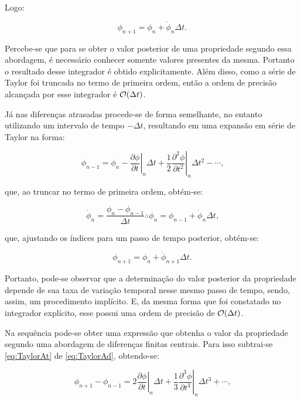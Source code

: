 \documentclass[_ArquivoPrincipal.tex]{subfiles}
\begin{document}
\noindent Logo:

\begin{equation}
    \phi_{n+1}=\phi_n+\dot{\phi}_n\Delta t\text{.}
\end{equation}

Percebe-se que para se obter o valor posterior de uma propriedade segundo essa abordagem, é necessário conhecer somente valores presentes da mesma. Portanto o resultado desse integrador é obtido explicitamente. Além disso, como a série de Taylor foi truncada no termo de primeira ordem, então a ordem de precisão alcançada por esse integrador é $\mathcal{O}(\Delta t)$.

Já nas diferenças atrasadas procede-se de forma semelhante, no entanto utilizando um intervalo de tempo $-\Delta t$, resultando em uma expansão em série de Taylor na forma:

\begin{equation}
    \phi_{n-1}=\phi_n-\left.\frac{\partial\phi}{\partial t}\right|_n\Delta t+\frac{1}{2}\left.\frac{\partial^2\phi}{\partial t^2}\right|_n\Delta t^2-\cdots\text{,}\label{eq:TaylorAt}
\end{equation}

\noindent que, ao truncar no termo de primeira ordem, obtém-se:

\begin{equation}
    \dot{\phi}_n=\frac{\phi_n-\phi_{n-1}}{\Delta t}\therefore
    \phi_n=\phi_{n-1}+\dot{\phi}_n\Delta t\text{,}
\end{equation}

\noindent que, ajustando os índices para um passo de tempo posterior, obtém-se:

\begin{equation}
    \phi_{n+1}=\phi_n+\dot{\phi}_{n+1}\Delta t\text{.}
\end{equation}

Portanto, pode-se observar que a determinação do valor posterior da propriedade depende de sua taxa de variação temporal nesse mesmo passo de tempo, sendo, assim, um procedimento implícito. E, da mesma forma que foi constatado no integrador explícito, esse possui uma ordem de precisão de $\mathcal{O}(\Delta t)$.

Na sequência pode-se obter uma expressão que obtenha o valor da propriedade segundo uma abordagem de diferenças finitas centrais. Para isso subtrai-se \ref{eq:TaylorAt} de \ref{eq:TaylorAd}, obtendo-se:

\begin{equation}
    \phi_{n+1}-\phi_{n-1}=2\left.\frac{\partial\phi}{\partial t}\right|_n\Delta t+\frac{1}{3}\left.\frac{\partial^3\phi}{\partial t^3}\right|_n\Delta t^3+\cdots\text{,}\label{eq:TaylorCen}
\end{equation}
\end{document}
